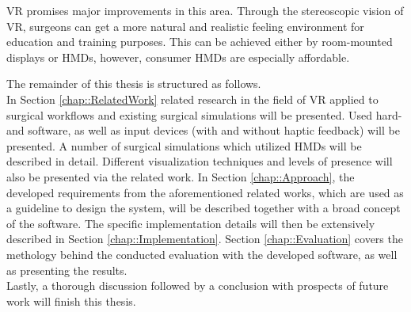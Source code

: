 VR promises major improvements in this area.
Through the stereoscopic vision of VR, surgeons can get a more natural and realistic feeling environment for education and training purposes.
This can be achieved either by room-mounted displays or HMDs, however, consumer HMDs are especially affordable.





The remainder of this thesis is structured as follows.
\\ In Section \ref{chap::RelatedWork} related research in the field of VR applied to surgical workflows and existing surgical simulations will be presented.
Used hard- and software, as well as input devices (with and without haptic feedback) will be presented.
A number of surgical simulations which utilized HMDs will be described in detail.
Different visualization techniques and levels of presence will also be presented via the related work.
In Section \ref{chap::Approach}, the developed requirements from the aforementioned related works, which are used as a guideline to design the system, will be described 
together with a broad concept of the software.
The specific implementation details will then be extensively described in Section \ref{chap::Implementation}.
Section \ref{chap::Evaluation} covers the methology behind the conducted evaluation with the developed software, as well as presenting the results.
\\ Lastly, a thorough discussion followed by a conclusion with prospects of future work will finish this thesis.